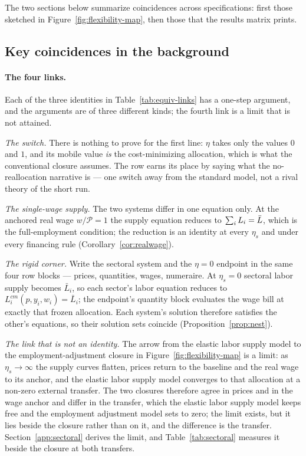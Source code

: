 The two sections below summarize coincidences across specifications: first
those sketched in Figure~\ref{fig:flexibility-map}, then those that the
results matrix prints.

\clearpage
\subsection*{Key coincidences in the background}



\paragraph{The four links.} Each of the three identities in
Table~\ref{tab:equiv-links} has a one-step argument, and the arguments are of
three different kinds; the fourth link is a limit that is not attained.

\emph{The switch.} There is nothing to prove for the first line: $\eta$ takes only the values $0$ and $1$, and its mobile value \emph{is} the cost-minimizing allocation, which is what the conventional closure assumes. The row earns its place by saying what the no-reallocation narrative is --- one switch away from the standard model, not a rival theory of the short run.

\emph{The single-wage supply.} The two systems differ in one equation only. At
the anchored real wage $w/\mathcal{P} = 1$ the supply equation reduces to
$\sum_i L_i = \bar{L}$, which is the full-employment condition; the reduction is
an identity at every $\eta_s$ and under every financing rule
(Corollary~\ref{cor:realwage}).

\emph{The rigid corner.} Write the sectoral system and the $\eta=0$ endpoint in
the same four row blocks --- prices, quantities, wages, numeraire. At
$\eta_s=0$ sectoral labor supply becomes $\bar L_i$, so each sector's labor
equation reduces to $L^{cm}_i(p,y_i,w_i)=\bar L_i$; the endpoint's quantity block
evaluates the wage bill at exactly that frozen allocation. Each system's
solution therefore satisfies the other's equations, so their solution sets
coincide (Proposition~\ref{prop:nest}).

\emph{The link that is not an identity.} The arrow from the elastic labor supply model to
the employment-adjustment closure in Figure~\ref{fig:flexibility-map} is a
limit: as $\eta_s\to\infty$ the supply curves flatten, prices return to the baseline and the real wage to its anchor, and the elastic labor supply model converges to that
allocation at a non-zero external transfer. The two closures therefore agree in prices and in the wage anchor and differ in the transfer, which the elastic labor supply model keeps free and the employment adjustment model sets to zero; the limit exists, but it lies beside the closure rather than on it, and the
difference is the transfer. Section~\ref{app:sectoral} derives the limit, and
Table~\ref{tab:sectoral} measures it beside the closure at both transfers.

